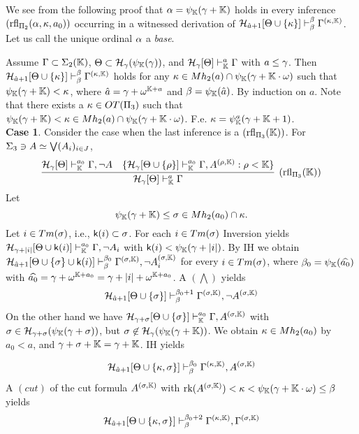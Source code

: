 \documentclass{article}
\newcommand{\mK}{\mathbb{K}}
\begin{document}
We see from the following proof that $\alp=\psi_{\mK}(\gam+\mK)$ holds
in
every inference $({\rm rfl}_{\Pi_{2}}(\alpha,\kappa,a_{0}))$ 
occurring
in a witnessed derivation of
$\calh_{\hat{a}+1}[\Tht\cup\{\kap\}]\vdash^{\bet}_{\bet}\Gam^{(\kap,\mK)}$.
Let us call the unique ordinal $\alpha$ a \textit{base}.

\blem\label{lem:lowerPi3}
Assume $\Gam\subset\Sig_{2}(\mK)$, $\Tht\subset\calh_{\gam}(\psi_{\mK}(\gam))$,
and
$\calh_{\gam}[\Tht]\vdash^{a}_{\mK}\Gam$ with $a\leq\gamma$.
Then 
$\calh_{\hat{a}+1}[\Tht\cup\{\kap\}]\vdash^{\bet}_{\bet}\Gam^{(\kap,\mK)}$ holds for any 
$\kap\in Mh_{2}(a)\cap\psi_{\mK}(\gam+\mK\cdot\ome)$ such that
$\psi_{\mK}(\gam+\mK)<\kap$,
where 
$\hat{a}=\gam+\ome^{\mK+a}$ and $\bet=\psi_{\mK}(\hat{a})$.
\elem
\bprf
By induction on $a$.
Note that there exists a $\kappa\in OT(\Pi_{3})$ such that 
$\psi_{\mK}(\gam+\mK)<\kap\in Mh_{2}(a)\cap\psi_{\mK}(\gam+\mK\cdot\ome)$.
F.e. $\kap=\psi_{\mK}^{a}(\gam+\mK+1)$.
\\
\textbf{Case 1}.
Consider the case when the last inference is a $({\rm rfl}_{\Pi_{3}}(\mK))$.
For $\Sigma_{3}\ni A\simeq\bigvee(A_{i})_{i\in J}$,
\[
\infer[({\rm rfl}_{\Pi_{3}}(\mK))]{
\calh_{\gam}[\Tht]\vdash^{a}_{\mK}\Gam}
{
\mathcal{H}_{\gam}[\Tht]\vdash^{a_{0}}_{\mK}\Gamma, \lnot A
&
\{
\mathcal{H}_{\gam}[\Tht\cup \{\rho\}]\vdash^{a_{0}}_{\mK}\Gamma, 
A^{(\rho,\mK)}: \rho<\mK\}
}
\]
Let 
\[
\psi_{\mK}(\gam+\mK)\leq\sig\in Mh_{2}(a_{0})\cap\kap 
.\]
Let $i\in Tm(\sigma)$, i.e., ${\sf k}(i)\subset\sigma$.
For each $i\in Tm(\sigma)$ Inversion yields
$\mathcal{H}_{\gam+|i|}[\Tht\cup\sfk(i)]\vdash^{a_{0}}_{\mK}\Gamma, \lnot A_{i}$
with $\sfk(i)<\psi_{\mK}(\gam+|i|)$.
By IH we obtain
$\mathcal{H}_{\hat{a}+1}[\Tht\cup \{\sig\}\cup\sfk(i)]\vdash^{\bet_{0}}_{\bet}\Gamma^{(\sig,\mK)}, \lnot A_{i}^{(\sig,\mK)}$ for every $i\in Tm(\sigma)$, where
$\bet_{0}=\psi_{\mK}(\widehat{a_{0}})$ with $\widehat{a_{0}}=\gam+\ome^{\mK+a_{0}}=\gam+|i|+\ome^{\mK+a_{0}}$.
A $(\bigwedge)$ yields
\[
\mathcal{H}_{\hat{a}+1}[\Tht\cup\{\sig\}]\vdash^{\bet_{0}+1}_{\bet}\Gamma^{(\sig,\mK)}, \lnot A^{(\sig,\mK)}
\]
On the other hand we have
$\mathcal{H}_{\gam+\sig}[\Tht\cup \{\sig\}]\vdash^{a_{0}}_{\mK}\Gamma, 
A^{(\sig,\mK)}$ with $\sig\in\calh_{\gam+\sig}(\psi_{\mK}(\gam+\sig))$, but
$\sig\not\in\calh_{\gam}(\psi_{\mK}(\gam+\mK))$.
We obtain 
$\kappa\in Mh_{2}(a_{0})$
by $a_{0}<a$, and $\gam+\sig+\mK=\gam+\mK$.
IH yields 


\[
\mathcal{H}_{\hat{a}+1}[\Tht\cup \{\kap,\sig\}]\vdash^{\bet_{0}}_{\bet}\Gamma^{(\kap,\mK)}, 
A^{(\sig,\mK)}
\]
A $(cut)$ of the cut formula $A^{(\sig,\mK)}$ with $\rk(A^{(\sig,\mK)})<\kap<\psi_{\mK}(\gam+\mK\cdot\ome)\leq\bet$ yields
\[
\mathcal{H}_{\hat{a}+1}[\Tht\cup \{\kap,\sig\}]\vdash^{\bet_{0}+2}_{\bet}\Gamma^{(\kap,\mK)},\Gam^{(\sig,\mK)}
\]
\end{document}
